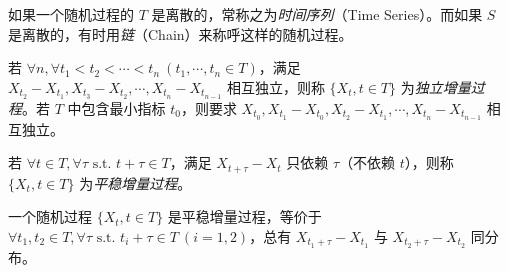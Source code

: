\documentclass[../main.tex]{subfiles}
\begin{document}
如果一个随机过程的 $T$ 是离散的，常称之为\emph{时间序列}（Time Series）。而如果 $S$ 是离散的，有时用\emph{链}（Chain）来称呼这样的随机过程。

\begin{definition*}
    若 $\forall n,\forall t_1<t_2<\cdots<t_n\ (t_1,\cdots,t_n\in T)$，满足 $X_{t_2}-X_{t_1},X_{t_3}-X_{t_2},\cdots,X_{t_n}-X_{t_{n-1}}$ 相互独立，则称 $\{X_t,t\in T\}$ 为\emph{独立增量过程}。若 $T$ 中包含最小指标 $t_0$，则要求 $X_{t_0},X_{t_1}-X_{t_0},X_{t_2}-X_{t_1},\cdots,X_{t_n}-X_{t_{n-1}}$ 相互独立。
\end{definition*}

\begin{definition*}
    若 $\forall t\in T,\forall\tau\text{ s.t. }t+\tau\in T$，满足 $X_{t+\tau}-X_t$ 只依赖 $\tau$（不依赖 $t$），则称 $\{X_t,t\in T\}$ 为\emph{平稳增量过程}。
\end{definition*}

一个随机过程 $\{X_t,t\in T\}$ 是平稳增量过程，等价于 $\forall t_1,t_2\in T,\forall\tau\text{ s.t. }t_i+\tau\in T\ (i=1,2)$，总有 $X_{t_1+\tau}-X_{t_1}$ 与 $X_{t_2+\tau}-X_{t_2}$ 同分布。
\end{document}
